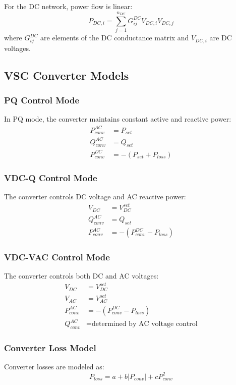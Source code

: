 \documentclass[11pt]{article}
\begin{document}
For the DC network, power flow is linear:
\begin{equation}
P_{DC,i} = \sum_{j=1}^{n_{DC}} G_{ij}^{DC} V_{DC,i} V_{DC,j}
\label{eq:dc_power}
\end{equation}
where $G_{ij}^{DC}$ are elements of the DC conductance matrix and $V_{DC,i}$ are DC voltages.

\subsection{VSC Converter Models}

\subsubsection{PQ Control Mode}
In PQ mode, the converter maintains constant active and reactive power:
\begin{align}
P_{conv}^{AC} &= P_{set} \\
Q_{conv}^{AC} &= Q_{set}\\
P_{conv}^{DC} &= -(P_{set} + P_{loss})
\end{align}

\subsubsection{VDC-Q Control Mode}
The converter controls DC voltage and AC reactive power:
\begin{align}
V_{DC} &= V_{DC}^{set} \\
Q_{conv}^{AC} &= Q_{set} \\
P_{conv}^{AC} &= -(P_{conv}^{DC} - P_{loss})
\end{align}

\subsubsection{VDC-VAC Control Mode}
The converter controls both DC and AC voltages:
\begin{align}
V_{DC} &= V_{DC}^{set} \\
V_{AC} &= V_{AC}^{set} \\
P_{conv}^{AC} &= -(P_{conv}^{DC} - P_{loss}) \\
Q_{conv}^{AC} &= \text{determined by AC voltage control}
\end{align}

\subsubsection{Converter Loss Model}
Converter losses are modeled as:
\begin{equation}
P_{loss} = a + b|P_{conv}| + cP_{conv}^2
\label{eq:conv_loss}
\end{equation}
\end{document}
